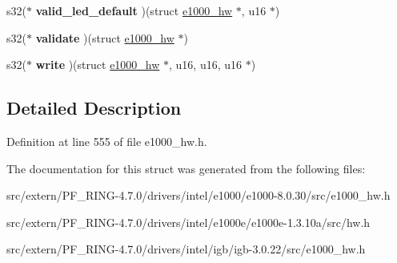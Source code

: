 \begin{DoxyCompactItemize}
\item 
\hypertarget{structe1000__nvm__operations_a57e6eba569a630f478401bc5aaf7db78}{
s32($\ast$ {\bfseries valid\_\-led\_\-default} )(struct \hyperlink{structe1000__hw}{e1000\_\-hw} $\ast$, u16 $\ast$)}
\label{structe1000__nvm__operations_a57e6eba569a630f478401bc5aaf7db78}

\item 
\hypertarget{structe1000__nvm__operations_adf9e499c46b449f765303f9276c91cc9}{
s32($\ast$ {\bfseries validate} )(struct \hyperlink{structe1000__hw}{e1000\_\-hw} $\ast$)}
\label{structe1000__nvm__operations_adf9e499c46b449f765303f9276c91cc9}

\item 
\hypertarget{structe1000__nvm__operations_ab23ce34194d967f284c9167de1949352}{
s32($\ast$ {\bfseries write} )(struct \hyperlink{structe1000__hw}{e1000\_\-hw} $\ast$, u16, u16, u16 $\ast$)}
\label{structe1000__nvm__operations_ab23ce34194d967f284c9167de1949352}

\end{DoxyCompactItemize}


\subsection{Detailed Description}


Definition at line 555 of file e1000\_\-hw.h.



The documentation for this struct was generated from the following files:\begin{DoxyCompactItemize}
\item 
src/extern/PF\_\-RING-\/4.7.0/drivers/intel/e1000/e1000-\/8.0.30/src/e1000\_\-hw.h\item 
src/extern/PF\_\-RING-\/4.7.0/drivers/intel/e1000e/e1000e-\/1.3.10a/src/hw.h\item 
src/extern/PF\_\-RING-\/4.7.0/drivers/intel/igb/igb-\/3.0.22/src/e1000\_\-hw.h\end{DoxyCompactItemize}
